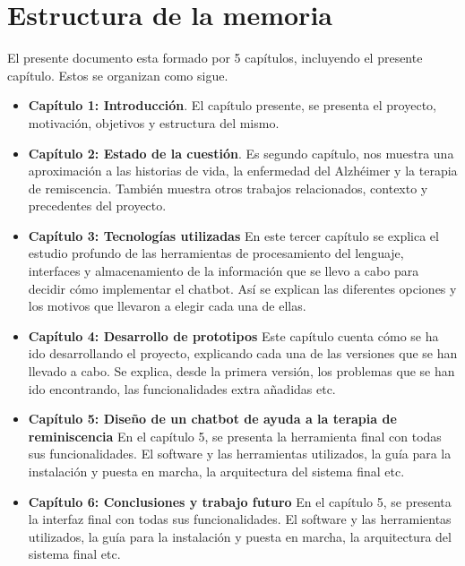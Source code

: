 \section{Estructura de la memoria}
El presente documento esta formado por 5  capítulos, incluyendo el presente capítulo. Estos se organizan como sigue. 
\begin{itemize}
	\item \textbf{Capítulo 1: Introducción}. El capítulo presente, se presenta el proyecto, motivación, objetivos y estructura del mismo. 
	\item \textbf{Capítulo 2: Estado de la cuestión}. Es segundo capítulo, nos muestra una aproximación a las historias de vida, la enfermedad del Alzhéimer y la terapia de remiscencia. También muestra otros trabajos relacionados, contexto y precedentes del proyecto. 
	\item \textbf{Capítulo 3: Tecnologías utilizadas} En este tercer capítulo se explica el estudio profundo de las herramientas de procesamiento del lenguaje, interfaces y almacenamiento de la información que se llevo a cabo para decidir cómo implementar el chatbot. Así se explican las diferentes opciones y los motivos que llevaron a elegir cada una de ellas. 
	\item \textbf{Capítulo 4: Desarrollo de prototipos}
	Este capítulo cuenta cómo se ha ido desarrollando el proyecto, explicando cada una de las versiones que se han llevado a cabo. Se explica, desde la primera versión, los problemas que se han ido encontrando, las funcionalidades extra añadidas etc. 
	\item \textbf{Capítulo 5: Diseño de un chatbot de ayuda a la terapia de reminiscencia}
	En el capítulo 5, se presenta la herramienta final con todas sus funcionalidades. El software y las herramientas utilizados, la guía para la instalación y puesta en marcha, la arquitectura del sistema final etc. 
	\item \textbf{Capítulo 6: Conclusiones y trabajo futuro}
	En el capítulo 5, se presenta la interfaz final con todas sus funcionalidades. El software y las herramientas utilizados, la guía para la instalación y puesta en marcha, la arquitectura del sistema final etc. 
	
\end{itemize}



